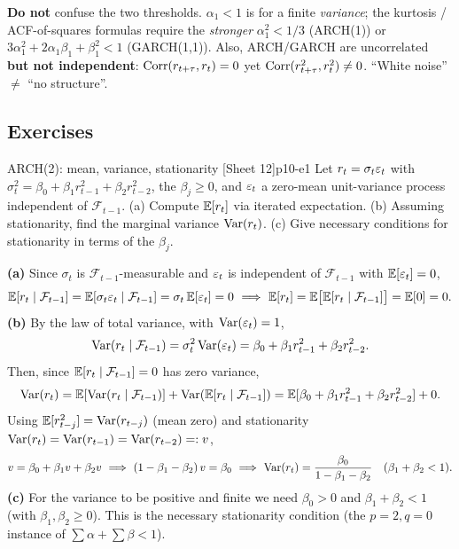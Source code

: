 \begin{pitfall}
\textbf{Do not} confuse the two thresholds. $\alpha_1<1$ is for a finite
\emph{variance}; the kurtosis / ACF-of-squares formulas require the
\emph{stronger} $\alpha_1^2<1/3$ (ARCH(1)) or
$3\alpha_1^2+2\alpha_1\beta_1+\beta_1^2<1$ (GARCH(1,1)). Also, ARCH/GARCH are
uncorrelated \textbf{but not independent}: $\operatorname{Corr}(r_{t+\tau},r_t)=0$ yet
$\operatorname{Corr}(r_{t+\tau}^2,r_t^2)\ne0$. ``White noise'' $\ne$ ``no structure''.
\end{pitfall}

\subsection{Exercises}

\begin{exercise}{ARCH(2): mean, variance, stationarity \quad\textnormal{[Sheet 12]}}{p10-e1}
Let $r_t=\sigma_t\varepsilon_t$ with $\sigma_t^2=\beta_0+\beta_1 r_{t-1}^2+\beta_2 r_{t-2}^2$,
the $\beta_j\ge0$, and $\varepsilon_t$ a zero-mean unit-variance process independent of
$\mathcal F_{t-1}$.
(a) Compute $\mathbb{E}[r_t]$ via iterated expectation.
(b) Assuming stationarity, find the marginal variance $\operatorname{Var}(r_t)$.
(c) Give necessary conditions for stationarity in terms of the $\beta_j$.
\end{exercise}
\begin{solution}
\textbf{(a)} Since $\sigma_t$ is $\mathcal F_{t-1}$-measurable and $\varepsilon_t$ is
independent of $\mathcal F_{t-1}$ with $\mathbb{E}[\varepsilon_t]=0$,
\[
\mathbb{E}[r_t\mid\mathcal F_{t-1}]=\mathbb{E}[\sigma_t\varepsilon_t\mid\mathcal F_{t-1}]
=\sigma_t\,\mathbb{E}[\varepsilon_t]=0
\ \Longrightarrow\
\mathbb{E}[r_t]=\mathbb{E}\big[\mathbb{E}[r_t\mid\mathcal F_{t-1}]\big]=\mathbb{E}[0]=0 .
\]
\textbf{(b)} By the law of total variance, with $\operatorname{Var}(\varepsilon_t)=1$,
\[
\operatorname{Var}(r_t\mid\mathcal F_{t-1})=\sigma_t^2\operatorname{Var}(\varepsilon_t)=\beta_0+\beta_1 r_{t-1}^2+\beta_2 r_{t-2}^2 .
\]
Then, since $\mathbb{E}[r_t\mid\mathcal F_{t-1}]=0$ has zero variance,
\[
\operatorname{Var}(r_t)=\mathbb{E}[\operatorname{Var}(r_t\mid\mathcal F_{t-1})]+\operatorname{Var}(\mathbb{E}[r_t\mid\mathcal F_{t-1}])
=\mathbb{E}[\beta_0+\beta_1 r_{t-1}^2+\beta_2 r_{t-2}^2]+0 .
\]
Using $\mathbb{E}[r_{t-j}^2]=\operatorname{Var}(r_{t-j})$ (mean zero) and stationarity
$\operatorname{Var}(r_t)=\operatorname{Var}(r_{t-1})=\operatorname{Var}(r_{t-2})=:v$,
\[
v=\beta_0+\beta_1 v+\beta_2 v
\ \Longrightarrow\
(1-\beta_1-\beta_2)\,v=\beta_0
\ \Longrightarrow\
\operatorname{Var}(r_t)=\frac{\beta_0}{1-\beta_1-\beta_2}\quad(\beta_1+\beta_2<1).
\]
\textbf{(c)} For the variance to be positive and finite we need
$\beta_0>0$ and $\beta_1+\beta_2<1$ (with $\beta_1,\beta_2\ge0$). This is the
necessary stationarity condition (the $p=2,q=0$ instance of
$\sum\alpha+\sum\beta<1$).
\end{solution}

